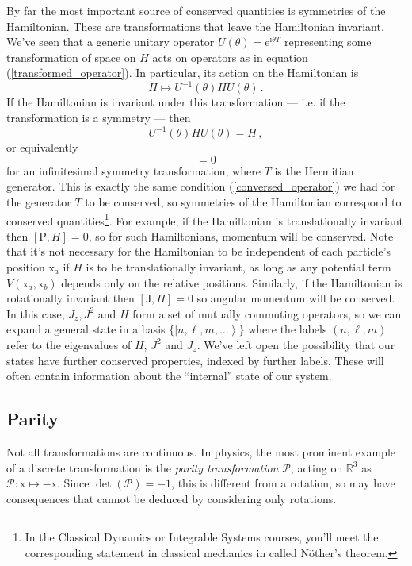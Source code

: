 \documentclass{article}
\theoremstyle{plain}\theoremheaderfont{\normalfont\itshape}\theorembodyfont{\rmfamily}\theoremseparator{.}\newtheorem*{rem}{Remark}\newtheorem*{ex}{Example}\newtheorem*{proof}{Proof}\newtheorem*{altp}{Alternative proof}
\theoremstyle{plain}\theoremheaderfont{\normalfont\bfseries}\theorembodyfont{\rmfamily}\theoremseparator{.}\newtheorem{thm}{Theorem}[section]\newtheorem{lem}[thm]{Lemma}\newtheorem{prop}[thm]{Proposition}\newtheorem*{cor}{Corollary}\newtheorem{defn}[thm]{Definition}\newtheorem{clm}[thm]{Claim}\newtheorem{clminproof}{Claim}
\theoremstyle{break}\theoremheaderfont{\normalfont\itshape}\theorembodyfont{\rmfamily}\theoremseparator{.\medskip}\newtheorem*{proofskip}{Proof}\newtheorem*{exs}{Examples}\newtheorem*{rems}{Remarks}
\theoremstyle{break}\theoremheaderfont{\normalfont\bfseries}\theorembodyfont{\rmfamily}\theoremseparator{.\medskip}\newtheorem{lemskip}[thm]{Lemma}\newtheorem{defnskip}[thm]{Definition}\newtheorem{propskip}[thm]{Proposition}\newtheorem{thmskip}[thm]{Theorem}
\numberwithin{equation}{section}
\newcommand{\ii}{\mathrm{i}}
\newcommand{\ee}{\mathrm{e}}
\newcommand{\ket}[1]{\left| #1 \right\rangle}
\newcommand{\vb}[1]{\bm{\mathrm{#1}}}
\newcommand{\RR}{\mathbb{R}}
\begin{document}
    By far the most important source of conserved quantities is symmetries of the Hamiltonian. These are transformations that leave the Hamiltonian invariant. We've seen that a generic unitary operator \(U(\theta)=\ee^{\ii \theta T}\) representing some transformation of space on \(H\) acts on operators as in equation (\ref{transformed_operator}). In particular, its action on the Hamiltonian is
    \begin{equation}
        H\longmapsto U^{-1}(\theta)HU(\theta)\,.
    \end{equation}
    If the Hamiltonian is invariant under this transformation --- i.e. if the transformation is a symmetry --- then
    \begin{equation}
        U^{-1}(\theta)HU(\theta)=H\,,
    \end{equation}
    or equivalently
    \begin{equation}
        [T,H]=0
    \end{equation}
    for an infinitesimal symmetry transformation, where \(T\) is the Hermitian generator. This is exactly the same condition (\ref{conversed_operator}) we had for the generator \(T\) to be conserved, so symmetries of the Hamiltonian correspond to conserved quantities\footnote{In the Classical Dynamics or Integrable Systems courses, you'll meet the corresponding statement in classical mechanics in called N\"{o}ther's theorem.}.
    For example, if the Hamiltonian is translationally invariant then \([\vb{P},H]=0\), so for such Hamiltonians, momentum will be conserved. Note that it's not necessary for the Hamiltonian to be independent of each particle's position \(\vb{x}_a\) if \(H\) is to be translationally invariant, as long as any potential term \(V(\vb{x}_a,\vb{x}_b)\) depends only on the relative positions. Similarly, if the Hamiltonian is rotationally invariant then \([\vb{J},H]=0\) so angular momentum will be conserved. In this case, \(J_z, J^2\) and \(H\) form a set of mutually commuting operators, so we can expand a general state in a basis \(\{\ket{n,\ell,m,\dots}\}\) where the labels \((n,\ell,m)\) refer to the eigenvalues of \(H\), \(J^2\) and \(J_z\). We've left open the possibility that our states have further conserved properties, indexed by further labels. These will often contain information about the ``internal'' state of our system.

    \subsection{Parity}\label{Chap:Parity}
    Not all transformations are continuous. In physics, the most prominent example of a discrete transformation is the \textit{parity transformation} \(\mathcal{P}\), acting on \(\RR^3\) as \(\mathcal{P}:\vb{x}\mapsto-\vb{x}\). Since \(\det(\mathcal{P})=-1\), this is different from a rotation, so may have consequences that cannot be deduced by considering only rotations.
\end{document}
